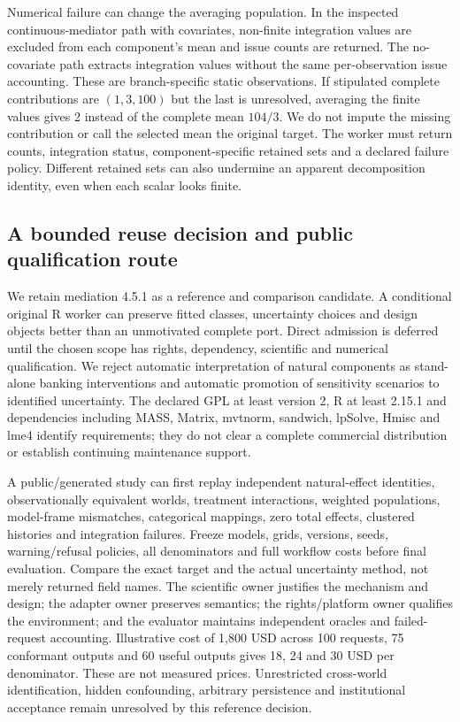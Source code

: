 Numerical failure can change the averaging population. In the inspected
continuous-mediator path with covariates, non-finite integration values are
excluded from each component's mean and issue counts are returned. The
no-covariate path extracts integration values without the same per-observation
issue accounting. These are branch-specific static observations. If stipulated
complete contributions are $(1,3,100)$ but the last is unresolved, averaging
the finite values gives 2 instead of the complete mean $104/3$. We do not
impute the missing contribution or call the selected mean the original target.
The worker must return counts, integration status, component-specific retained
sets and a declared failure policy. Different retained sets can also undermine
an apparent decomposition identity, even when each scalar looks finite.
\citep{exec24_mediation_sources,exec24_mediation_contract}

\subsection{A bounded reuse decision and public qualification route}
We retain mediation 4.5.1 as a reference and comparison candidate. A conditional
original R worker can preserve fitted classes, uncertainty choices and design
objects better than an unmotivated complete port. Direct admission is deferred
until the chosen scope has rights, dependency, scientific and numerical
qualification. We reject automatic interpretation of natural components as
stand-alone banking interventions and automatic promotion of sensitivity
scenarios to identified uncertainty. The declared GPL at least version 2,
R at least 2.15.1 and dependencies including MASS, Matrix, mvtnorm, sandwich,
lpSolve, Hmisc and lme4 identify requirements; they do not clear a complete
commercial distribution or establish continuing maintenance support.
\citep{exec24_mediation_sources,exec24_mediation_contract}

A public/generated study can first replay independent natural-effect
identities, observationally equivalent worlds, treatment interactions,
weighted populations, model-frame mismatches, categorical mappings, zero total
effects, clustered histories and integration failures. Freeze models, grids,
versions, seeds, warning/refusal policies, all denominators and full workflow
costs before final evaluation. Compare the exact target and the actual
uncertainty method, not merely returned field names. The scientific owner
justifies the mechanism and design; the adapter owner preserves semantics;
the rights/platform owner qualifies the environment; and the evaluator
maintains independent oracles and failed-request accounting. Illustrative
cost of 1,800 USD across 100 requests, 75 conformant outputs and 60 useful
outputs gives 18, 24 and 30 USD per denominator. These are not measured prices.
Unrestricted cross-world identification, hidden confounding, arbitrary
persistence and institutional acceptance remain unresolved by this reference
decision.~\citep{exec24_mediation_contract}
